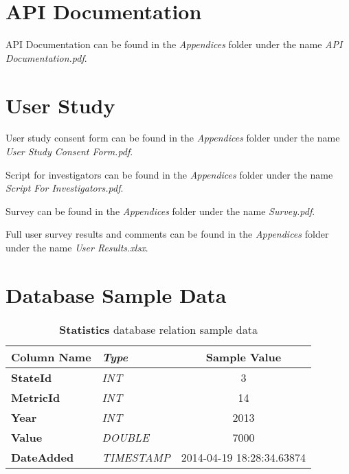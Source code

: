 \begin{appendices}

	\chapter{API Documentation} \label{app:apidoc}

		API Documentation can be found in the \emph{Appendices} folder under the
		name \emph{API Documentation.pdf}.

	\chapter{User Study} \label{app:userstudydocs}

		User study consent form can be found in the \emph{Appendices} folder 
		under the name \emph{User Study Consent Form.pdf}.
		
		Script for investigators can be found in the \emph{Appendices} folder 
		under the name \emph{Script For Investigators.pdf}.

		Survey can be found in the \emph{Appendices} folder under the name 
		\emph{Survey.pdf}.
		
		Full user survey results and comments can be found in the 
		\emph{Appendices} folder under the name \emph{User Results.xlsx}.

	\chapter{Database Sample Data} \label{app:dbsample}

		\begin{table}[h]
			\centering
			\begin{tabularx}{\textwidth}{@{} >{\bf}Y >{\em}l c @{}} %
				\toprule
				Column Name	& Type		& Sample Value				\\
				\midrule
				
				StateId		& INT		& 3							\\
				MetricId	& INT		& 14						\\
				Year		& INT		& 2013						\\
				Value		& DOUBLE	& 7000						\\
				DateAdded	& TIMESTAMP	& 2014-04-19 18:28:34.63874	\\
				
				\bottomrule
			\end{tabularx}
			\caption{\textbf{Statistics} database relation sample data}
			\label{tbl:statstable}
		\end{table}
		

\end{appendices}

